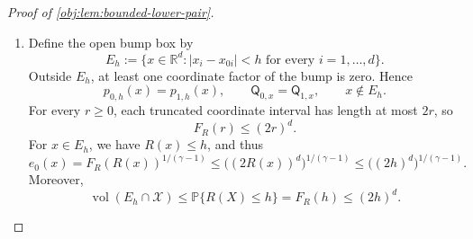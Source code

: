 \begin{proof}[Proof of \cref{obj:lem:bounded-lower-pair}]
\begin{enumerate}
The control parameters agree, so the control contribution to entropy
is zero. The treated contribution satisfies the preceding quadratic
bound. Conditioning on the binary treatment therefore gives
\[
\begin{aligned}
\operatorname{KL}(\mathsf V_{0,x},\mathsf V_{1,x})
&=(1-e_0(x))
  \operatorname{KL}\!\left(
  \operatorname{Bernoulli}(\theta_0),
  \operatorname{Bernoulli}(\theta_0)\right)\\
&\quad+
e_0(x)\operatorname{KL}\!\left(
\operatorname{Bernoulli}(p_{0,h}(x)),
\operatorname{Bernoulli}(p_{1,h}(x))\right)\\
&\le \frac{2}{\theta_0}(ah^\beta)^2e_0(x).
\end{aligned}
\]
Applying entropy contraction first to recording the covariate and then
to scaling the binary outcome yields
\[
\operatorname{KL}(\mathsf Q_{0,x},\mathsf Q_{1,x})
\le
\operatorname{KL}(\mathsf W_{0,x},\mathsf W_{1,x})
\le
\operatorname{KL}(\mathsf V_{0,x},\mathsf V_{1,x})
\le
\frac{2}{\theta_0}(ah^\beta)^2e_0(x).
\]
In particular, the conditional entropies are finite.

\item Define the open bump box by
\[
E_h:=\{x\in\mathbb R^d:|x_i-x_{0i}|<h
\text{ for every }i=1,\ldots,d\}.
\]
Outside \(E_h\), at least one coordinate factor of the bump is zero.
Hence
\[
p_{0,h}(x)=p_{1,h}(x),
\qquad
\mathsf Q_{0,x}=\mathsf Q_{1,x},
\qquad x\notin E_h.
\]
For every \(r\ge0\), each truncated coordinate interval has length at
most \(2r\), so
\[
F_R(r)\le(2r)^d.
\]
For \(x\in E_h\), we have \(R(x)\le h\), and thus
\[
e_0(x)
=F_R(R(x))^{1/(\gamma-1)}
\le \bigl((2R(x))^d\bigr)^{1/(\gamma-1)}
\le \bigl((2h)^d\bigr)^{1/(\gamma-1)}.
\]
Moreover,
\[
\operatorname{vol}(E_h\cap\mathcal X)
\le\mathbb P\{R(X)\le h\}
=F_R(h)
\le(2h)^d.
\]


\end{enumerate}
\end{proof}
